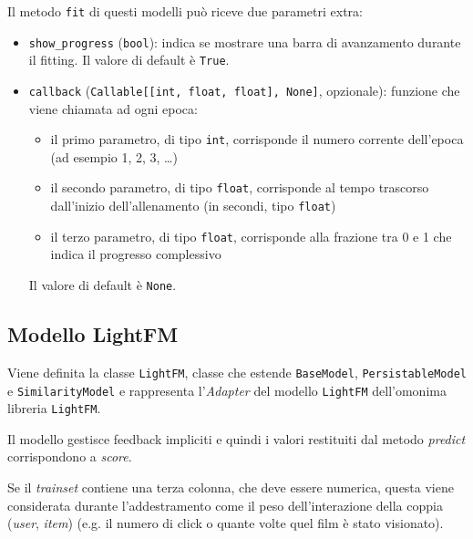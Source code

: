 Il metodo \texttt{fit} di questi modelli può riceve due parametri extra:

\begin{itemize}
    \item \texttt{show\_progress} (\texttt{bool}): indica se mostrare una barra di avanzamento durante il fitting. Il valore di default è \texttt{True}.
    \item \texttt{callback} (\texttt{Callable[[int, float, float], None]}, opzionale): funzione che viene chiamata ad ogni epoca:
    \begin{itemize}
        \item il primo parametro, di tipo \texttt{int}, corrisponde il numero corrente dell'epoca (ad esempio 1, 2, 3, \ldots)
        \item il secondo parametro, di tipo \texttt{float}, corrisponde al tempo trascorso dall'inizio dell'allenamento (in secondi, tipo \texttt{float})
        \item il terzo parametro, di tipo \texttt{float}, corrisponde alla frazione tra 0 e 1 che indica il progresso complessivo
    \end{itemize}
    Il valore di default è \texttt{None}.
\end{itemize}

\subsection{Modello LightFM}
Viene definita la classe \texttt{LightFM}, classe che estende \texttt{BaseModel}, \texttt{PersistableModel} e \texttt{SimilarityModel} e rappresenta l'\textit{Adapter} del modello \texttt{LightFM} dell'omonima libreria \texttt{LightFM}. 

Il modello gestisce feedback impliciti e quindi i valori restituiti dal metodo \textit{predict} corrispondono a \textit{score}.

Se il \textit{trainset} contiene una terza colonna, che deve essere numerica, questa viene considerata durante l'addestramento come il peso dell'interazione della coppia (\textit{user}, \textit{item}) (e.g. il numero di click o quante volte quel film è stato visionato). 

